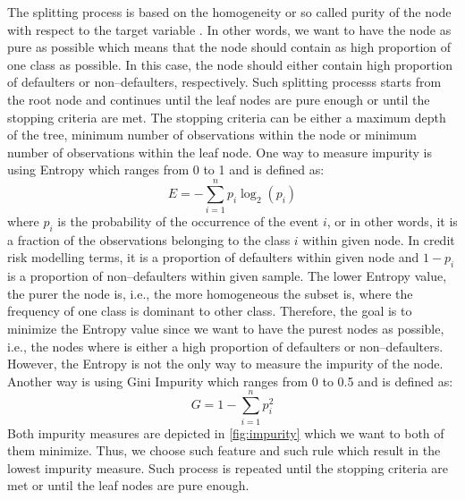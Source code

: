 The splitting process is based on the homogeneity or so called purity of the node with respect to the target variable \citep{provost2013data}.
In other words, we want to have the node as pure as possible which means that the node should contain as high proportion of one class as possible.
In this case, the node should either contain high proportion of defaulters or non--defaulters, respectively.
Such splitting processs starts from the root node and continues until the leaf nodes are pure enough or until the stopping criteria are met.
The stopping criteria can be either a maximum depth of the tree, minimum number of observations within the node or minimum number of observations within the leaf node.
One way to measure impurity is using Entropy which ranges from 0 to 1 and is defined as:
\begin{equation}\label{eq}
    E = -\sum_{i=1}^{n} p_i \log_2 \left(p_i\right)
    \end{equation}
where $p_i$ is the probability of the occurrence of the event $i$, or in other words, it is a fraction of the observations belonging to the class $i$ within given node. In credit risk modelling terms, it is a proportion of defaulters within given node and $1-p_i$ is a proportion of non--defaulters within given sample.
The lower Entropy value, the purer the node is, i.e., the more homogeneous the subset is, where the frequency of one class is dominant to other class.
Therefore, the goal is to minimize the Entropy value since we want to have the purest nodes as possible, i.e., the nodes where is either a high proportion of defaulters or non--defaulters. 
However, the Entropy is not the only way to measure the impurity of the node. Another way is using Gini Impurity which ranges from 0 to 0.5 and is defined as:
\begin{equation}\label{eq}
    G = 1 - \sum_{i=1}^{n} p_{i}^{2}
\end{equation}
Both impurity measures are depicted in \autoref{fig:impurity} which we want to both of them minimize. Thus, we choose such feature and such rule which result in the lowest impurity measure. Such process is repeated until the stopping criteria are met or until the leaf nodes are pure enough.
